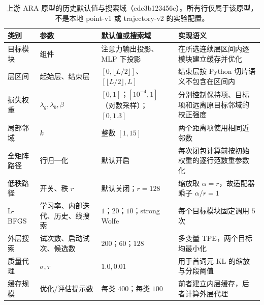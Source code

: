 \begin{table}[t]
  \centering
  \caption{上游 ARA 原型的历史默认值与搜索域（edc3b123456c）。所有行仅属于该原型，不是本地 point-v1 或 trajectory-v2 的实验配置。}
  \label{tab:source-parameters}
  \footnotesize
  \setlength{\tabcolsep}{4pt}
  \renewcommand{\arraystretch}{1.12}
  \begin{tabularx}{\textwidth}{@{}p{22mm}p{32mm}p{58mm}Y@{}}
    \toprule
    类别 & 参数 & 默认值或搜索域 & 实现语义 \\
    \midrule
    目标模块 & 组件 & 注意力输出投影、MLP 下投影 & 在所选连续层区间内逐模块建立缓存并优化 \\
    层区间 & 起始层、结束层 & $[0,\lfloor L/2\rfloor]$、$[\lfloor L/2\rfloor,L]$ & 结束层按 Python 切片语义不包含在区间内 \\
    损失权重 & $\lambda_g,\lambda_b,\beta$ & $[0,1]$；$[10^{-4},1]$（对数采样）；$[0,1.3]$ & 分别控制保持项、目标项和远离原目标邻域的校正强度 \\
    局部邻域 & $k$ & 整数 $[1,15]$ & 两个距离项使用相同近邻数 \\
    全矩阵路径 & 行归一化 & 默认开启 & 每次闭包计算前按初始权重的逐行范数重参数化 \\
    低秩路径 & 开关、秩 $r$ & 默认关闭；$r=128$ & 缩放取 $\alpha=r$，故适配器乘子 $\alpha/r=1$ \\
    L-BFGS & 学习率、内部迭代、历史、线搜索 & $1$；$20$；$10$；strong Wolfe & 每个目标模块固定调用 $5$ 次  \\
    外层搜索 & 试次数、启动试次、候选数 & $200$；$60$；$128$ & 多变量 TPE，两个目标均最小化 \\
    质量代理 & $\sigma,\tau$ & $1.0,0.01$ & 用于首词元 KL 的缩放与分段阈值 \\
    缓存规模 & 优化/评估提示数 & 每类 $400$；每类 $100$ & 前者建立内层缓存，后者计算外层代理 \\
    \bottomrule
  \end{tabularx}
\end{table}
